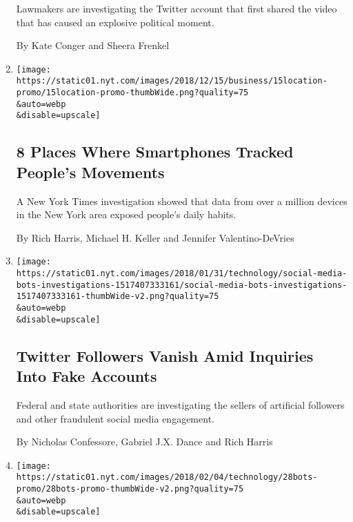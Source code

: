 \begin{enumerate}
  Lawmakers are investigating the Twitter account that first shared the
  video that has caused an explosive political moment.

  By Kate Conger and Sheera Frenkel
\item
  \href{/2018/12/15/business/location-tracking-phones.html}{}

  \texttt{[image: https://static01.nyt.com/images/2018/12/15/business/15location-promo/15location-promo-thumbWide.png?quality=75\\\&auto=webp\\\&disable=upscale]}

  \hypertarget{8-places-where-smartphones-tracked-peoples-movements}{%
  \subsection{8 Places Where Smartphones Tracked People's
  Movements}\label{8-places-where-smartphones-tracked-peoples-movements}}

  A New York Times investigation showed that data from over a million
  devices in the New York area exposed people's daily habits.

  By Rich Harris, Michael H. Keller and Jennifer Valentino-DeVries
\item
  \href{/interactive/2018/01/31/technology/social-media-bots-investigations.html}{}

  \texttt{[image: https://static01.nyt.com/images/2018/01/31/technology/social-media-bots-investigations-1517407333161/social-media-bots-investigations-1517407333161-thumbWide-v2.png?quality=75\\\&auto=webp\\\&disable=upscale]}

  \hypertarget{twitter-followers-vanish-amid-inquiries-into-fake-accounts}{%
  \subsection{Twitter Followers Vanish Amid Inquiries Into Fake
  Accounts}\label{twitter-followers-vanish-amid-inquiries-into-fake-accounts}}

  Federal and state authorities are investigating the sellers of
  artificial followers and other fraudulent social media engagement.

  By Nicholas Confessore, Gabriel J.X. Dance and Rich Harris
\item
  \href{/interactive/2018/01/27/technology/social-media-bots-es.html}{}

  \texttt{[image: https://static01.nyt.com/images/2018/02/04/technology/28bots-promo/28bots-promo-thumbWide-v2.png?quality=75\\\&auto=webp\\\&disable=upscale]}


\end{enumerate}
